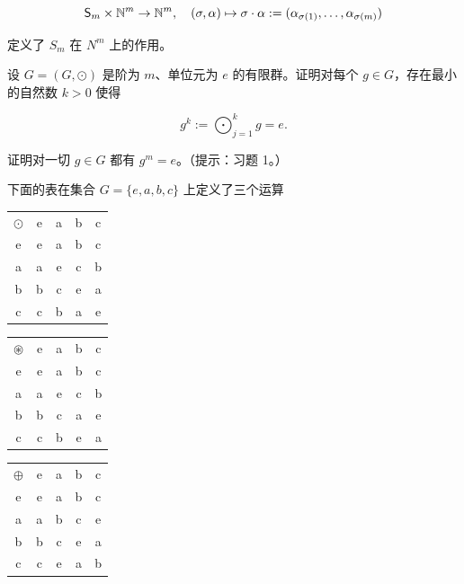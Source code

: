\begin{exercises}
\begin{items}
\[
{\sf S}_{m}\times{\mathbb{N}}^{m}\to{\mathbb{N}}^{m},\quad(\sigma,\alpha)\mapsto\sigma\cdot\alpha:=(\alpha_{\sigma(1)},\ldots,\alpha_{\sigma(m)})
\]

定义了 $ S_{m} $ 在 $ N^{m} $ 上的作用。

\end{items}

\item

设 $ G = (G, \odot) $ 是阶为 $ m $、单位元为 $ e $ 的有限群。证明对每个 $ g \in G $，存在最小的自然数 $ k > 0 $ 使得

\[
g^{k}:=\bigodot_{j=1}^{k}g=e.
\]

证明对一切 $ g \in G $ 都有 $ g^m = e $。（提示：习题 1。）

\item

下面的表在集合 $ G = \{e, a, b, c\} $ 上定义了三个运算

\begin{center}
\begin{tabular}{ccccc}
\toprule
$ \odot $ & e & a & b & c \\
e & e & a & b & c \\
a & a & e & c & b \\
b & b & c & e & a \\
c & c & b & a & e \\
\bottomrule
\end{tabular}
\end{center}

\begin{center}
\begin{tabular}{ccccc}
\toprule
$ \circledast $ & e & a & b & c \\
e & e & a & b & c \\
a & a & e & c & b \\
b & b & c & a & e \\
c & c & b & e & a \\
\bottomrule
\end{tabular}
\end{center}

\begin{center}
\begin{tabular}{ccccc}
\toprule
$ \oplus $ & e & a & b & c \\
e & e & a & b & c \\
a & a & b & c & e \\
b & b & c & e & a \\
c & c & e & a & b \\
\bottomrule
\end{tabular}
\end{center}


\end{exercises}
